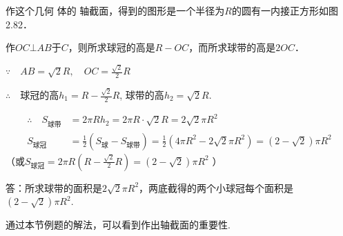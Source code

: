 \begin{solution}
作这个几何 体的 轴截面，得到的图形是一个半径为$R$的圆有一内接正方形如图2.82．

\noindent
\begin{minipage}{.7\textwidth}\CTEXindent
    作$OC\bot AB$于$C$，则所求球冠的高是$R-OC$，而所求球带的高是$2OC$．

    $\because\quad AB=\sqrt{2}R,\quad OC=\frac{\sqrt{2}}{2}R$
    
    $\therefore\quad $球冠的高$h_1=R-\frac{\sqrt{2}}{2}R$, 球带的高$h_2=\sqrt{2}R$.
\end{minipage}
\hfill
\begin{minipage}{.28\textwidth}
\centering
{}
\end{minipage}
\[\begin{split}
    \therefore\quad S_{\text{球带}}&=2\pi Rh_2=2\pi R\cdot \sqrt{2}R=2\sqrt{2}\pi R^2\\
S_{\text{球冠}}&=\frac{1}{2}(S_{\text{球}}-S_{\text{球带}})
=\frac{1}{2}\left(4\pi R^2-2\sqrt{2}\pi R^2\right)
=\left(2-\sqrt{2}\right)\pi R^2
\end{split}\]
（或$S_{\text{球冠}}=2\pi R \left(R-\frac{\sqrt{2}}{2}R\right)=\left(2-\sqrt{2}\right)\pi R^2$   ）

答：所求球带的面积是$2\sqrt{2}\pi R^2$，两底截得的两个小球冠每个面积是$(2-\sqrt{2})\pi R^2$.
\end{solution}

\begin{remark}
通过本节例题的解法，可以看到作出轴截面的重要性.
\end{remark}

